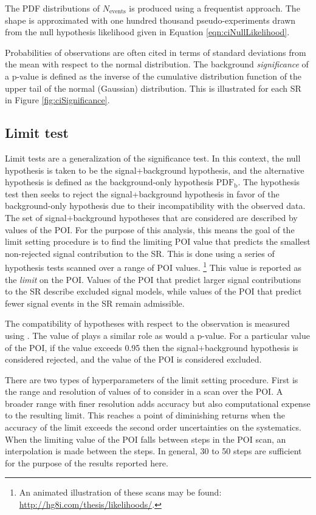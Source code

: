 The PDF distributions of $N_\text{events}$ is produced using a frequentist approach.
The shape is approximated with one hundred thousand pseudo-experiments drawn from the null hypothesis likelihood given in Equation \ref{eqn:ciNullLikelihood}.

Probabilities of observations are often cited in terms of standard deviations from the mean with respect to the normal distribution.
The background \emph{significance} of a p-value is defined as the inverse of the cumulative distribution function of the upper tail of the normal (Gaussian) distribution.
This is illustrated for each SR in Figure \ref{fig:ciSignificance}.

\subsection{Limit test}\label{sec:ciLimitSetting}

Limit tests are a generalization of the significance test. %
In this context, the null hypothesis is taken to be the signal+background hypothesis, and the alternative hypothesis is defined as the background-only hypothesis $\text{PDF}_\text{b}$.
The hypothesis test then seeks to reject the signal+background hypothesis in favor of the background-only hypothesis due to their incompatibility with the observed data.
The set of signal+background hypotheses that are considered are described by values of the POI.
For the purpose of this analysis, this means the goal of the limit setting procedure is to find the limiting POI value that predicts the smallest non-rejected signal contribution to the SR.
This is done using a series of hypothesis tests scanned over a range of POI values. \footnote{An animated illustration of these scans may be found: \url{http://hg8i.com/thesis/likelihoods/}.}
This value is reported as the \emph{limit} on the POI.
Values of the POI that predict larger signal contributions to the SR describe excluded signal models, while values of the POI that predict fewer signal events in the SR remain admissible.

The compatibility of hypotheses with respect to the observation is measured using \cls.
The value of \cls plays a similar role as would a p-value.
For a particular value of the POI, if the \cls value exceeds 0.95 then the signal+background hypothesis is considered rejected, and the value of the POI is considered excluded.

There are two types of hyperparameters of the limit setting procedure.
First is the range and resolution of values of to consider in a scan over the POI.
A broader range with finer resolution adds accuracy but also computational expense to the resulting limit.
This reaches a point of diminishing returns when the accuracy of the limit exceeds the second order uncertainties on the systematics.
When the limiting value of the POI falls between steps in the POI scan, an interpolation is made between the steps.
In general, 30 to 50 steps are sufficient for the purpose of the results reported here.

